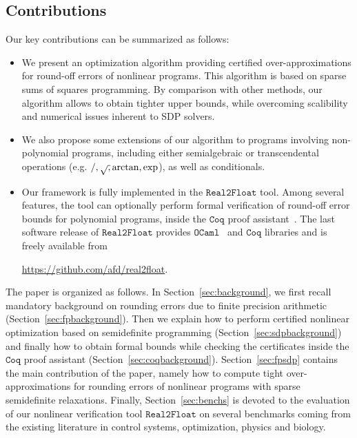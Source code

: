 \documentclass[a4paper,10pt]{article}
\newcommand{\realtofloat}{\mathtt{Real2Float}}
\newcommand{\ocaml}{\mathtt{OCaml}}
\newcommand{\coq}{\mathtt{Coq}}
\theoremstyle{plain}
\theoremstyle{definition}
\theoremstyle{remark}
\begin{document}
\subsection{Contributions}
Our key contributions can be summarized as follows:
\begin{itemize}
\item We present an optimization algorithm providing certified over-approximations for round-off errors of nonlinear programs. This algorithm is based on sparse sums of squares programming. By comparison with other methods, our algorithm allows to obtain tighter upper bounds, while overcoming scalibility and numerical issues inherent to SDP solvers.
\item We also propose some extensions of our algorithm to programs involving non-polynomial programs, including either semialgebraic or transcendental operations (e.g. $/, \sqrtsign, \arctan, \exp$), as well as conditionals.
\item Our framework is fully implemented in the $\realtofloat$ tool.  Among several features, the tool can optionally perform formal verification of round-off error bounds for polynomial programs, inside the $\coq$ proof assistant~\cite{CoqProofAssistant}. The last software release of $\realtofloat$ provides $\ocaml$~\cite{OCaml} and $\coq$ libraries and is freely available from 
\begin{center}
\url{https://github.com/afd/real2float}.
\end{center}
\end{itemize}

The paper is organized as follows.
%
In Section~\ref{sec:background}, we first recall mandatory background on rounding errors due to finite precision arithmetic (Section~\ref{sec:fpbackground}). Then we explain how to perform certified nonlinear optimization based on semidefinite programming (Section~\ref{sec:sdpbackground}) and finally how to obtain formal bounds while checking the certificates inside the $\coq$ proof assistant (Section~\ref{sec:coqbackground}).
%
Section~\ref{sec:fpsdp} contains the main contribution of the paper, namely how to compute tight over-approximations for rounding errors of nonlinear programs with sparse semidefinite relaxations.
%
Finally, Section~\ref{sec:benchs} is devoted to the evaluation of our nonlinear verification tool $\realtofloat$ on several benchmarks coming from the existing literature in control systems, optimization, physics and biology.

\end{document}
